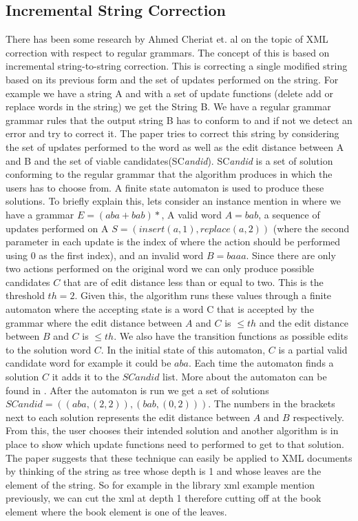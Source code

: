 \documentclass{report}
\begin{document}
\subsection{Incremental String Correction}
There has been some research by Ahmed Cheriat et. al\cite{cheriat2005incremental} on the topic of XML correction with respect to regular grammars. The concept of this is based on incremental string-to-string correction. This is correcting a single modified string based on its previous form and the set of updates performed on the string. For example we have a string \textsf{A} and with a set of update functions (delete add or replace words in the string) we get the String \textsf{B}. We have a regular grammar grammar rules that the output string \textsf{B} has to conform to and if not we detect an error and try to correct it. The paper \cite{cheriat2005incremental} tries to correct this string by considering the set of updates performed to the word as well as the edit distance between \textsf{A} and \textsf{B} and the set of viable candidates(SC\textit{andid}). SC\textit{andid} is a set of solution conforming to the regular grammar that the algorithm produces in which the users has to choose from. A finite state automaton is used to produce these solutions. To briefly explain this, lets consider an instance mention in \cite{cheriat2005incremental} where we have a grammar $E = (aba + bab)*$, A valid word $A = bab$, a sequence of updates performed on A $S = (insert(a,1),replace(a,2))$ (where the second parameter in each update is the index of where the action should be performed using 0 as the first index), and an invalid word $B = baaa$. Since there are only two actions performed on the original word we can only produce possible candidates $C$ that are of edit distance less than or equal to two. This is the threshold $th = 2$. Given this, the algorithm runs these values through a finite automaton where the accepting state is a word C that is accepted by the grammar where the edit distance between $A$ and $C$ is $\leq th$ and the edit distance between $B$ and $C$ is $\leq th$. We also have the transition functions as possible edits to the solution word $C$. In the initial state of this automaton, $C$ is a partial valid candidate word for example it could be $aba$. Each time the automaton finds a solution $C$ it adds it to the $SC\textit{andid}$ list. More about the automaton can be found in \cite{cheriat2005incremental}. After the automaton is run we get a set of solutions  $SC\textit{andid} = ((aba,(2,2)),(bab,(0,2)))$. The numbers in the brackets next to each solution represents the edit distance between $A$ and $B$ respectively. From this, the user chooses their intended solution and another algorithm is in place \cite{cheriat2005incremental} to show which update functions need to performed to get to that solution. The paper suggests that these technique can easily be applied to XML documents by thinking of the string as tree whose depth is 1 and whose leaves are the element of the string. So for example in the library xml example mention previously, we can cut the xml at depth 1 therefore cutting off at the book element where the book element is one of the leaves. 
\end{document}

